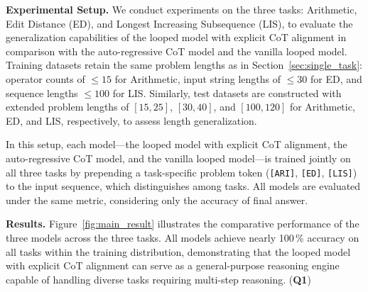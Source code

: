 \textbf{Experimental Setup. }
We conduct experiments on the three tasks: Arithmetic, Edit Distance (ED), and Longest Increasing Subsequence (LIS), to evaluate the generalization capabilities of the looped model with explicit CoT alignment in comparison with the auto-regressive CoT model and the vanilla looped model. Training datasets 
retain the same problem lengths as in Section~\ref{sec:single_task}: operator counts of $\leq 15$ for Arithmetic, input string lengths of $\leq 30$ for ED, and sequence lengths $\leq 100$ for LIS. Similarly, test datasets are constructed with extended problem lengths of $[15, 25]$, $[30, 40]$, and $[100, 120]$ for Arithmetic, ED, and LIS, respectively, to assess length generalization.

In this setup, each model---the looped model with explicit CoT alignment, the auto-regressive CoT model, and the vanilla looped model---is trained jointly on all three tasks by prepending a task-specific problem token (\texttt{[ARI]}, \texttt{[ED]}, \texttt{[LIS]}) to the input sequence, which distinguishes among tasks. All models are evaluated under the same metric, considering only the accuracy of final answer.






\textbf{Results. }
Figure~\ref{fig:main_result} illustrates the comparative performance of the three models across the three tasks. All models achieve nearly 100\,\% accuracy on all tasks within the training distribution, demonstrating that the looped model with explicit CoT alignment can serve as a general-purpose reasoning engine capable of handling diverse tasks requiring multi-step reasoning. (\textbf{Q1})

